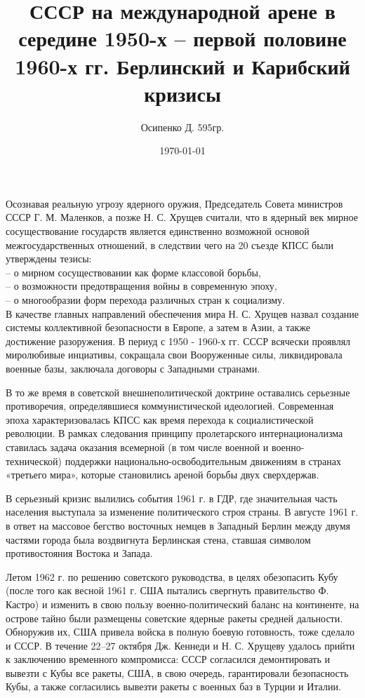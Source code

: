 \documentclass[a4paper, 12pt]{article}
\title{СССР на международной арене в середине 1950-х – первой половине 1960-х гг. Берлинский и Карибский кризисы}
\author{Осипенко Д. 595гр.}
\date{\today}
\begin{document}
\sffamily
\maketitle
Осознавая реальную угрозу ядерного оружия, Председатель Совета министров СССР Г. М. Маленков, а позже Н. С. Хрущев считали, что в ядерный век мирное сосуществование государств является единственно возможной основой межгосударственных отношений, в следствии чего на 20 съезде КПСС были утверждены тезисы:\\

–  о мирном сосуществовании как форме классовой борьбы,\\

–  о возможности предотвращения войны в современную эпоху,\\

–  о многообразии форм перехода различных стран к социализму.\\

В качестве главных направлений обеспечения мира Н. С. Хрущев назвал создание системы коллективной безопасности в Европе, а затем в Азии, а также достижение разоружения. В периуд с 1950 - 1960-х гг. СССР всячески проявлял миролюбивые инциативы, сокращала свои Вооруженные силы, ликвидировала военные базы, заключала договоры с Западными странами.

В то же время в советской внешнеполитической доктрине оставались серьезные противоречия, определявшиеся коммунистической идеологией. Современная эпоха характеризовалась КПСС как время перехода к социалистической революции. В рамках следования принципу пролетарского интернационализма ставилась задача оказания всемерной (в том числе военной и военно-технической) поддержки национально-освободительным движениям в странах «третьего мира», которые становились ареной борьбы двух сверхдержав.

В серьезный кризис вылились события 1961 г. в ГДР, где значительная часть населения выступала за изменение политического строя страны. В августе 1961 г. в ответ на массовое бегство восточных немцев в Западный Берлин между двумя частями города была воздвигнута Берлинская стена, ставшая символом противостояния Востока и Запада.

Летом 1962 г. по решению советского руководства, в целях обезопасить Кубу (после того как весной 1961 г. США пытались свергнуть правительство Ф. Кастро) и изменить в свою пользу военно-политический баланс на континенте, на острове тайно были размещены советские ядерные ракеты средней дальности. Обноружив их, США привела войска в полную боевую готовность, тоже сделало и СССР. В течение 22–27 октября Дж. Кеннеди и Н. С. Хрущеву удалось прийти к заключению временного компромисса: СССР согласился демонтировать и вывезти с Кубы все ракеты, США, в свою очередь, гарантировали безопасность Кубы, а также согласились вывезти ракеты с военных баз в Турции и Италии.
\end{document}

